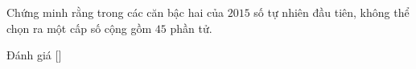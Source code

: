 \ifshowproblem
\begin{problem}\label{problem:ROU-2015-MO-9-P1}
    Chứng minh rằng trong các căn bậc hai của \(2015\) số tự nhiên đầu tiên, không thể chọn ra một cấp số cộng gồm \(45\) phần tử.
\end{problem}
\fi

\ifshowinfo
Đánh giá [\textbf{}]\footnotemark
{}
\fi
